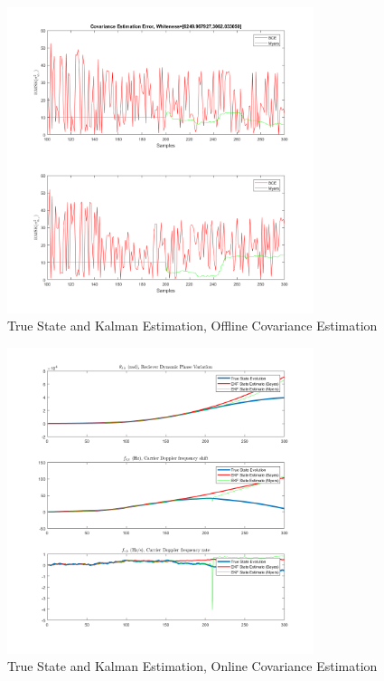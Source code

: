 \documentclass[11pt]{article}
\begin{document}
\begin{figure}[ht]
    \centering
    \includegraphics[width=0.8\textwidth]{Final Project/figures/off3.png}
    \caption{True State and Kalman Estimation, Offline Covariance Estimation}
    \label{fig:off3}
\end{figure}

\begin{figure}[ht]
    \centering
    \includegraphics[width=0.8\textwidth]{Final Project/figures/on1.png}
    \caption{True State and Kalman Estimation, Online Covariance Estimation}
    \label{fig:on1}
\end{figure}
\end{document}
